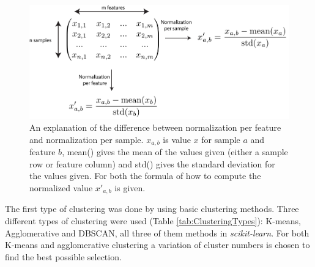 \documentclass[10pt,a4paper]{report}
\begin{document}
	\begin{figure}[H]
		\includegraphics[width=1\textwidth]{Normalization.png}
		\caption{An explanation of the difference between normalization per feature and normalization per sample. $x_{a,b}$ is value $x$ for sample $a$ and feature $b$, mean() gives the mean of the values given (either a sample row or feature column) and std() gives the standard deviation for the values given. For both the formula of how to compute the normalized value $x'_{a,b}$ is given.}
		\label{fig:Normalization}
	\end{figure}
	
	The first type of clustering was done by using basic clustering methods. Three different types of clustering were used (Table \ref{tab:ClusteringTypes}): K-means, Agglomerative and DBSCAN, all three of them methods in \textit{scikit-learn}. For both K-means and agglomerative clustering a variation of cluster numbers is chosen to find the best possible selection.
	
\end{document}
